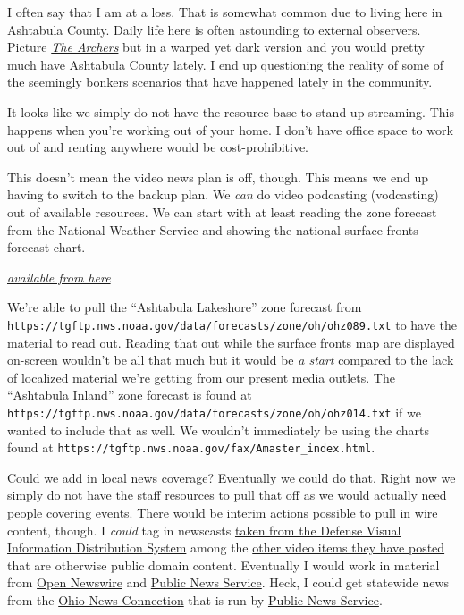 I often say that I am at a loss. That is somewhat common due to living
here in Ashtabula County. Daily life here is often astounding to
external observers. Picture
\href{https://en.wikipedia.org/w/index.php?title=The_Archers&oldid=1130700473}{\emph{The
Archers}} but in a warped yet dark version and you would pretty much
have Ashtabula County lately. I end up questioning the reality of some
of the seemingly bonkers scenarios that have happened lately in the
community.

It looks like we simply do not have the resource base to stand up
streaming. This happens when you're working out of your home. I don't
have office space to work out of and renting anywhere would be
cost-prohibitive.

This doesn't mean the video news plan is off, though. This means we end
up having to switch to the backup plan. We \emph{can} do video
podcasting (vodcasting) out of available resources. We can start with at
least reading the zone forecast from the National Weather Service and
showing the national surface fronts forecast chart.

\href{https://www.wpc.ncep.noaa.gov/national_forecast/natfcst.php}{\emph{available
from here}}

We're able to pull the ``Ashtabula Lakeshore'' zone forecast from
\texttt{https://tgftp.nws.noaa.gov/data/forecasts/zone/oh/ohz089.txt} to
have the material to read out. Reading that out while the surface fronts
map are displayed on-screen wouldn't be all that much but it would be
\emph{a start} compared to the lack of localized material we're getting
from our present media outlets. The ``Ashtabula Inland'' zone forecast
is found at
\texttt{https://tgftp.nws.noaa.gov/data/forecasts/zone/oh/ohz014.txt} if
we wanted to include that as well. We wouldn't immediately be using the
charts found at
\texttt{https://tgftp.nws.noaa.gov/fax/Amaster\_index.html}.

Could we add in local news coverage? Eventually we could do that. Right
now we simply do not have the staff resources to pull that off as we
would actually need people covering events. There would be interim
actions possible to pull in wire content, though. I \emph{could} tag in
newscasts
\href{https://www.dvidshub.net/search/?q=&filter\%5Btype\%5D=video&filter\%5Bcategory\%5D=Newscasts&view=grid&sort=publishdate}{taken
from the Defense Visual Information Distribution System} among the
\href{https://www.dvidshub.net/search/?q=&filter\%5Btype\%5D=video&view=grid&sort=publishdate}{other
video items they have posted} that are otherwise public domain content.
Eventually I would work in material from
\href{https://mediahelpingmedia.org/strategy/content-sharing-for-the-benefit-of-all/}{Open
Newswire} and \href{https://www.publicnewsservice.org/}{Public News
Service}. Heck, I could get statewide news from the
\href{https://www.publicnewsservice.org/state-ohio/OH}{Ohio News
Connection} that is run by
\href{https://www.publicnewsservice.org/}{Public News Service}.

